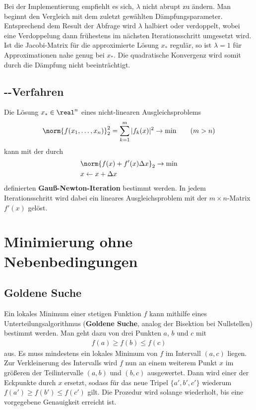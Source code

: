 Bei der Implementierung empfiehlt es sich, $\lambda$ nicht abrupt zu ändern.
Man beginnt den Vergleich mit dem zuletzt gewählten Dämpfungsparameter.
Entsprechend dem Result der Abfrage wird $\lambda$ halbiert oder verdoppelt,
wobei eine Verdoppelung dann frühestens im nächsten Iterationsschritt
umgesetzt wird.
Ist die Jacobi-Matrix für die approximierte Lösung $x_\ast$ regulär,
so ist $\lambda = 1$ für Approximationen nahe genug bei $x_\ast$.
Die quadratische Konvergenz wird somit durch die Dämpfung nicht
beeinträchtigt.

\pagebreak

\subsection{%
    --Verfahren%
}

Die Lösung $x_\ast \in \real^n$ eines nicht-linearen Ausgleichsproblems
\begin{align*}
    \norm{f(x_1, \dotsc, x_n)}_2^2
    = \sum_{k=1}^m |f_k(x)|^2 \rightarrow \min
    \qquad (m > n)
\end{align*}
kann mit der durch
\begin{align*}
    & \norm{f(x) + f'(x) \Delta x}_2 \rightarrow \min \\
    & x \leftarrow x + \Delta x
\end{align*}
definierten \textbf{Gauß-Newton-Iteration} bestimmt werden.
In jedem Iterationsschritt wird dabei ein lineares Ausgleichsproblem mit der
$m \times n$-Matrix $f'(x)$ gelöst.

\pagebreak

\section{%
    Minimierung ohne Nebenbedingungen%
}

\subsection{%
    Goldene Suche%
}

Ein lokales Minimum einer stetigen Funktion $f$ kann mithilfe eines
Unterteilungsalgorithmus
(\textbf{Goldene Suche}, analog der Bisektion bei Nullstellen) bestimmt werden.
Man geht dazu von drei Punkten $a$, $b$ und $c$ mit
\begin{align*}
    f(a) \ge f(b) \le f(c)
\end{align*}
aus.
Es muss mindestens ein lokales Minimum von $f$ im Intervall $(a, c)$ liegen.
Zur Verkleinerung des Intervalls wird $f$ nun an einem weiterem Punkt $x$ im
größeren der Teilintervalle $(a, b)$ und $(b, c)$ ausgewertet.
Dann wird einer der Eckpunkte durch $x$ ersetzt, sodass für das neue Tripel
$\{a', b', c'\}$ wiederum $f(a') \ge f(b') \le f(c')$ gilt.
Die Prozedur wird solange wiederholt, bis eine vorgegebene Genauigkeit erreicht
ist.

